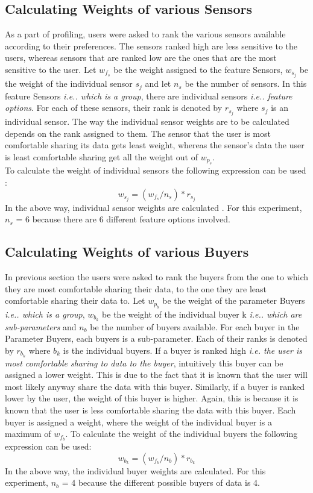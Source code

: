 \subsection{Calculating Weights of various Sensors}
As a part of profiling, users were asked to rank the various sensors available according to their preferences. The sensors ranked high are less sensitive
to the users, whereas sensors that are ranked low are the ones that are the most sensitive to the user.
Let $w_{f_{s}}$ be the weight assigned to the feature Sensors, $w_{s_{j}}$ be the weight of the individual sensor $s_j$ and let $n_s$ be the number of sensors. In this feature Sensors {\it i.e.. which is a group}, there are individual sensors {\it i.e.. feature options}.
For each of these sensors, their rank is denoted by $r_{s_{j}}$ where $s_j$ is an individual sensor. The way the individual sensor weights are to be 
calculated depends on the rank assigned to them. The sensor that the user is most comfortable sharing its data gets least weight, whereas the sensor's
data the user is least comfortable sharing get all the weight out of $w_{p_{s}}$.\\
To calculate the weight of individual sensors the following expression can be used :
$$w_{s_{j}} = (w_{f_{s}}/n_s)*r_{s_{j}}$$
In the above way, individual sensor weights are calculated . For this experiment, $n_s$ = 6 because there are 6 different feature options involved.

\subsection{Calculating Weights of various Buyers}
In previous section the users were asked to rank the buyers from the one to which they are most comfortable sharing their data,
to the one they are least comfortable sharing their data to. Let $w_{p_{b}}$ be the weight of the parameter Buyers {\it i.e.. which is a group}, $w_{b_{k}}$ be the weight of
the individual buyer k {\it i.e.. which are sub-parameters} and $n_b$ be the number of buyers available. For each buyer in the Parameter Buyers, each buyers is a sub-parameter.
Each of their ranks is denoted by $r_{b_{k}}$ where $b_k$ is the individual buyers.  If a buyer is ranked high {\it i.e. the user is most comfortable sharing to data to the buyer}, intuitively this buyer can be assigned a lower weight.
This is due to the fact that it is known that the user will most likely anyway share the data with this buyer. Similarly, if a buyer is ranked lower by the user, the weight of this buyer is higher. Again,
this is because it is known that the user is less comfortable sharing the data with this buyer.
Each buyer is assigned a weight, where the weight of the individual
buyer is a maximum of $w_{f_{b}}$. To calculate the weight of the individual buyers the following expression can be used:
$$w_{b_{k}} = (w_{f_{b}}/n_b)*r_{b_{k}}$$
In the above way, the individual buyer weights are calculated. For this experiment, $n_b$ = 4 because the different possible buyers of data is 4.




